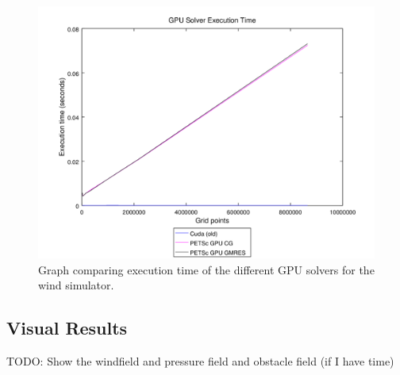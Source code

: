\begin{figure}[ht]
	\center
	\includegraphics[width=1.0\textwidth]{results/data/sb/exec_time_gpu}
	\caption{Graph comparing execution time of the different GPU solvers for the
		wind simulator.}
	\label{fig:sb_exec_time_gpu}
\end{figure}

\subsection{Visual Results}

TODO: Show the windfield and pressure field and obstacle field (if I have time)
